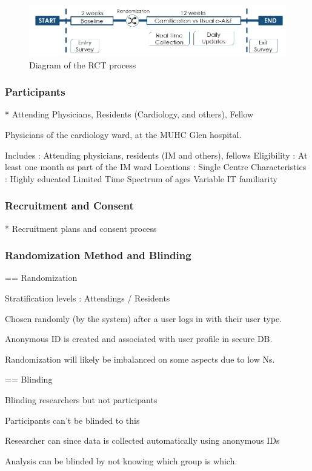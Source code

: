 \begin{figure}[h]
    \centering
    \includegraphics[width=\textwidth]{img/rct_flow.png}
    \caption{Diagram of the RCT process}
    \label{fig:rct_flow}
\end{figure}

\subsubsection{Participants}
* Attending Physicians, Residents (Cardiology, and others), Fellow

Physicians of the cardiology ward, at the MUHC Glen hospital.

Includes : Attending physicians, residents (IM and others), fellows
Eligibility : At least one month as part of the IM ward
Locations : Single Centre
Characteristics : 
Highly educated
Limited Time
Spectrum of ages
Variable IT familiarity


\subsubsection{Recruitment and Consent}
* Recruitment plans and consent process

\subsubsection{Randomization Method and Blinding}
== Randomization

Stratification levels : Attendings / Residents

Chosen randomly (by the system) after a user logs in with their user type.

Anonymous ID is created and associated with user profile in secure DB.

Randomization will likely be imbalanced on some aspects due to low Ns.


== Blinding

Blinding researchers but not participants

Participants can’t be blinded to this

Researcher can since data is collected automatically using anonymous IDs

Analysis can be blinded by not knowing which group is which.

